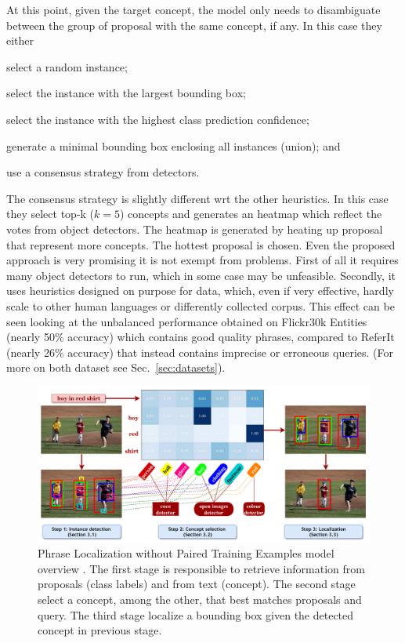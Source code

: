 At this point, given the target concept, the model only needs to
disambiguate between the group of proposal with the same concept, if
any. In this case they either
\begin{enumerate*}[label=(\roman*)] 
  \item select a random instance;
  \item select the instance with the largest bounding box; 
  \item select the instance with the highest class prediction
  confidence;
  \item generate a minimal bounding box enclosing all instances
  (union); and
  \item use a consensus strategy from detectors.
\end{enumerate*} 
The consensus strategy is slightly different wrt the other heuristics.
In this case they select top-k ($k = 5$) concepts and generates an
heatmap which reflect the votes from object detectors. The heatmap is
generated by heating up proposal that represent more concepts. The
hottest proposal is chosen. Even the proposed approach is very
promising it is not exempt from problems. First of all it requires
many object detectors to run, which in some case may be unfeasible.
Secondly, it uses heuristics designed on purpose for data, which, even
if very effective, hardly scale to other human languages or
differently collected corpus. This effect can be seen looking at the
unbalanced performance obtained on Flickr30k Entities (nearly 50\%
accuracy) which contains good quality phrases, compared to ReferIt
(nearly 26\% accuracy) that instead contains imprecise or erroneous
queries. (For more on both dataset see Sec.~\ref{sec:datasets}). 

\begin{figure}
  \centering
  \includegraphics[width=.8\textwidth]{figures/phraseloc-model.png}
  \caption[Phrase Localization without Paired Training Examples model
  overview]{Phrase Localization without Paired Training Examples model
  overview \cite{wang2019phrase}. The first stage is responsible to
  retrieve information from proposals (class labels) and from text
  (concept). The second stage select a concept, among the other, that
  best matches proposals and query. The third stage localize a
  bounding box given the detected concept in previous stage.}
  \label{fig:phraseloc-model}
\end{figure}

